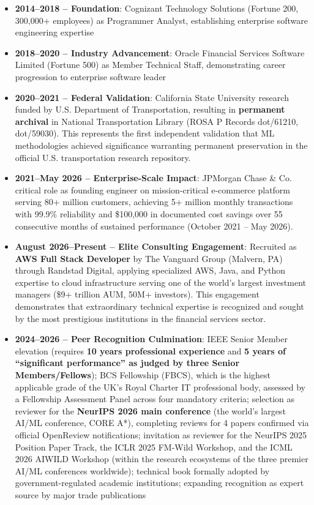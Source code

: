 \begin{itemize}
    \item \textbf{2014--2018 -- Foundation}: Cognizant Technology Solutions (Fortune 200, 300,000+ employees) as Programmer Analyst, establishing enterprise software engineering expertise

    \item \textbf{2018--2020 -- Industry Advancement}: Oracle Financial Services Software Limited (Fortune 500) as Member Technical Staff, demonstrating career progression to enterprise software leader

    \item \textbf{2020--2021 -- Federal Validation}: California State University research funded by U.S. Department of Transportation, resulting in \textbf{permanent archival} in National Transportation Library (ROSA P Records dot/61210, dot/59030). This represents the first independent validation that \drs ML methodologies achieved significance warranting permanent preservation in the official U.S. transportation research repository.

    \item \textbf{2021--May 2026 -- Enterprise-Scale Impact}: JPMorgan Chase \& Co. critical role as founding engineer on mission-critical e-commerce platform serving 80+ million customers, achieving 5+ million monthly transactions with 99.9\% reliability and \$100,000 in documented cost savings over 55 consecutive months of sustained performance (October 2021 -- May 2026).

    \item \textbf{August 2026--Present -- Elite Consulting Engagement}: Recruited as \textbf{AWS Full Stack Developer} by The Vanguard Group (Malvern, PA) through Randstad Digital, applying specialized AWS, Java, and Python expertise to cloud infrastructure serving one of the world's largest investment managers (\$9+ trillion AUM, 50M+ investors). This engagement demonstrates that \drs extraordinary technical expertise is recognized and sought by the most prestigious institutions in the financial services sector.

    \item \textbf{2024--2026 -- Peer Recognition Culmination}: IEEE Senior Member elevation (requires \textbf{10 years professional experience} and \textbf{5 years of ``significant performance'' as judged by three Senior Members/Fellows}); BCS Fellowship (FBCS), which is the highest applicable grade of the UK's Royal Charter IT professional body, assessed by a Fellowship Assessment Panel across four mandatory criteria; selection as reviewer for the \textbf{NeurIPS 2026 main conference} (the world's largest AI/ML conference, CORE A*), completing reviews for 4 papers confirmed via official OpenReview notifications; invitation as reviewer for the NeurIPS 2025 Position Paper Track, the ICLR 2025 FM-Wild Workshop, and the ICML 2026 AIWILD Workshop (within the research ecosystems of the three premier AI/ML conferences worldwide); technical book formally adopted by government-regulated academic institutions; expanding recognition as expert source by major trade publications
\end{itemize}

